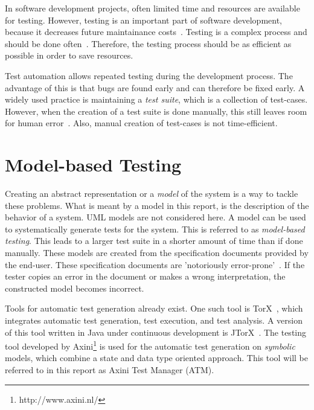 In software development projects, often limited time and resources are available for testing. However, testing is an important part of software development, because it decreases future maintainance costs~\cite{McConnell:testing}. Testing is a complex process and should be done often~\cite{Pol:testing}. Therefore, the testing process should be as efficient as possible in order to save resources.

Test automation allows repeated testing during the development process. The advantage of this is that bugs are found early and can therefore be fixed early.  A widely used practice is maintaining a \textit{test suite}, which is a collection of test-cases. However, when the creation of a test suite is done manually, this still leaves room for human error~\cite{Blackburn:testing}. Also, manual creation of test-cases is not time-efficient.

\section{Model-based Testing}
Creating an abstract representation or a \textit{model} of the system is a way to tackle these problems. What is meant by a model in this report, is the description of the behavior of a system. UML models are not considered here. A model can be used to systematically generate tests for the system. This is referred to as \textit{model-based testing}. This leads to a larger test suite in a shorter amount of time than if done manually. These models are created from the specification documents provided by the end-user. These specification documents are 'notoriously error-prone'~\cite{McCabe:testing}. If the tester copies an error in the document or makes a wrong interpretation, the constructed model becomes incorrect.

Tools for automatic test generation already exist. One such tool is TorX~\cite{Tretmans:TorX}, which integrates automatic test generation, test execution, and test analysis. A version of this tool written in Java under continuous development is JTorX~\cite{Belinfante:JTorX}. The testing tool developed by Axini\footnote{http://www.axini.nl/} is used for the automatic test generation on \textit{symbolic} models, which combine a state and data type oriented approach. This tool will be referred to in this report as Axini Test Manager (ATM).


